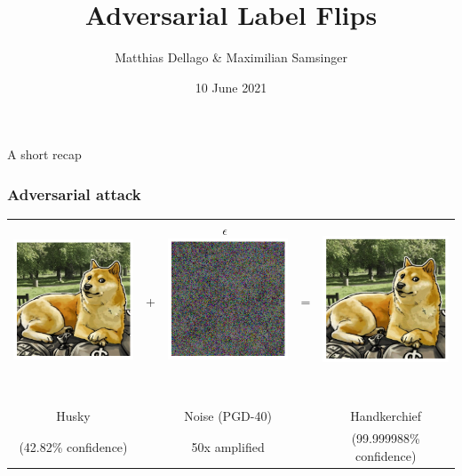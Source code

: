 \documentclass[10pt,usepdftitle=false,aspectratio=169]{beamer}
\title{Adversarial Label Flips}
\author{Matthias Dellago \& Maximilian Samsinger}
\date{10 June 2021}
\begin{document}
\DeclarePairedDelimiter\abs{\lvert}{\rvert}%
\DeclarePairedDelimiter\norm{\lVert}{\rVert}%
\DeclarePairedDelimiter\ceil{\lceil}{\rceil}
\DeclarePairedDelimiter\floor{\lfloor}{\rfloor}

\begin{frame}[plain]
	\maketitle
\end{frame}	

\begin{frame}[plain]
	\huge A short recap
\end{frame}	


\begin{frame}
	\frametitle{Adversarial attack}
	\begin{tabular}{ccccc}
		\includegraphics[align=c,width=0.28\columnwidth]{plots/original_04282.png} & \Huge{+} & \Huge{\textbf{$\epsilon$}}\ \includegraphics[align=c,width=0.28\columnwidth]{plots/difference_amplified_by_50.png}\ & \Huge{=} & \includegraphics[align=c,width=0.28\columnwidth]{plots/adversarial_09999.png} \\~\\
		\huge{Husky} &&\qquad \large{Noise (PGD-40)}&& \huge{Handkerchief} \\
		(42.82\% confidence) && \qquad 50x amplified && (99.999988\% confidence) 
	\end{tabular}
\end{frame}
\end{document}
